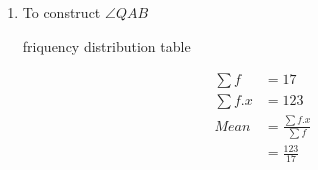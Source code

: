 \renewcommand{\theequation}{\theenumi}
\begin{enumerate}[label=\arabic*.,ref=\thesubsection.\theenumi]
\item 
\begin{table}[!ht]
\centering

\caption{To construct $\angle QAB$}
\caption{friquency distribution table }
\end{table}
\begin{align}
\sum{f} &= 17
\\
\sum{f.x} &= 123 
\\
Mean &= \frac{\sum{f.x}}{\sum{f}}
\\&= \frac{123}{17}
\end{align}
\end{enumerate}
